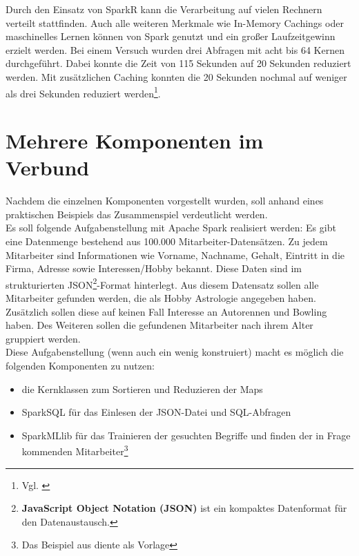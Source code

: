\noindent
Durch den Einsatz von SparkR kann die Verarbeitung auf vielen Rechnern verteilt stattfinden. Auch alle weiteren Merkmale wie In-Memory Cachings oder maschinelles Lernen können von Spark genutzt und ein großer Laufzeitgewinn erzielt werden. Bei einem Versuch wurden drei Abfragen mit acht bis 64 Kernen durchgeführt. Dabei konnte die Zeit von 115 Sekunden auf 20 Sekunden reduziert werden. Mit zusätzlichen Caching konnten die 20 Sekunden nochmal auf weniger als drei Sekunden reduziert werden\footnote{Vgl. \cite{VYL+16}}.



\newpage
\section{Mehrere Komponenten im Verbund}\label{sec_verbund}

Nachdem die einzelnen Komponenten vorgestellt wurden, soll anhand eines praktischen Beispiels das Zusammenspiel verdeutlicht werden. \\

\noindent
Es soll folgende Aufgabenstellung mit Apache Spark realisiert werden: Es gibt eine Datenmenge bestehend aus 100.000 Mitarbeiter-Datensätzen. Zu jedem Mitarbeiter sind Informationen wie Vorname, Nachname, Gehalt, Eintritt in die Firma, Adresse sowie Interessen/Hobby bekannt. Diese Daten sind im strukturierten JSON\footnote{\textbf{JavaScript Object Notation (JSON)} ist ein kompaktes Datenformat für den Datenaustausch. }-Format hinterlegt. 
Aus diesem Datensatz sollen alle Mitarbeiter gefunden werden, die als Hobby Astrologie angegeben haben. Zusätzlich sollen diese auf keinen Fall Interesse an Autorennen und Bowling haben. Des Weiteren sollen die gefundenen Mitarbeiter nach ihrem Alter gruppiert werden. \\
Diese Aufgabenstellung (wenn auch ein wenig konstruiert) macht es möglich die folgenden Komponenten zu nutzen:
\begin{itemize}
	\item die Kernklassen zum Sortieren und Reduzieren der Maps
	\item SparkSQL für das Einlesen der JSON-Datei und SQL-Abfragen
	\item SparkMLlib für das Trainieren der gesuchten Begriffe und finden der in Frage kommenden Mitarbeiter\footnote{Das Beispiel aus \cite{GITHUB_EXAMPLE} diente als Vorlage}	
\end{itemize}  

